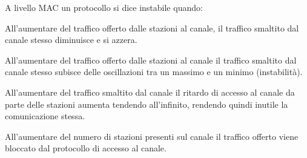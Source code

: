 \question
A livello MAC un protocollo si dice instabile quando:

\begin{checkboxes}
	\CorrectChoice All'aumentare del traffico offerto dalle stazioni al canale, il traffico smaltito dal canale stesso diminuisce e si azzera.

	\choice All'aumentare del traffico offerto dalle stazioni al canale il traffico smaltito dal canale stesso subisce delle oscillazioni tra un massimo e un minimo (instabilità).

	\choice All'aumentare del traffico smaltito dal canale il ritardo di accesso al canale da parte delle stazioni aumenta tendendo all'infinito, rendendo quindi inutile la comunicazione stessa.

	\choice All'aumentare del numero di stazioni presenti sul canale il traffico offerto viene bloccato dal protocollo di accesso al canale.
\end{checkboxes}
